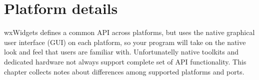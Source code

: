 \chapter{Platform details}\label{platformdetails}
%
\setfooter{\thepage}{}{}{}{}{\thepage}%

wxWidgets defines a common API across platforms, but uses the native graphical
user interface (GUI) on each platform, so your program will take on the native
look and feel that users are familiar with. Unfortunatelly native toolkits and
dedicated hardware not always support complete set of API functionality. This
chapter collects notes about differences among supported platforms and ports.









